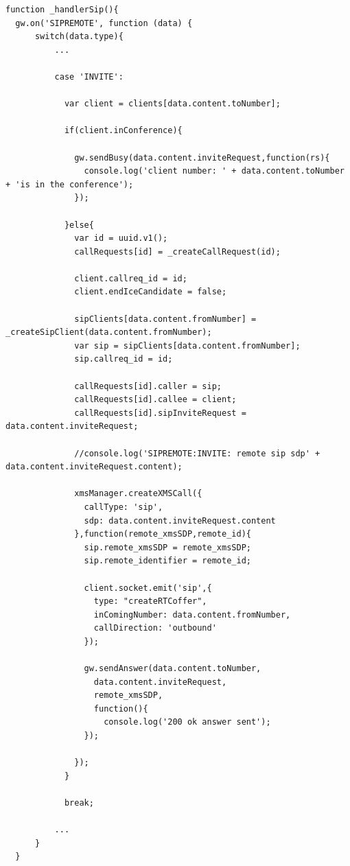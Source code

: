 \begin{lstlisting}[caption={SIPREMOTE event handler for INVITE message},label={code:socket_remote_invite}]
function _handlerSip(){
  gw.on('SIPREMOTE', function (data) {
      switch(data.type){
          ...
          
          case 'INVITE':

            var client = clients[data.content.toNumber];

            if(client.inConference){

              gw.sendBusy(data.content.inviteRequest,function(rs){
                console.log('client number: ' + data.content.toNumber + 'is in the conference');
              });

            }else{
              var id = uuid.v1();
              callRequests[id] = _createCallRequest(id);

              client.callreq_id = id;
              client.endIceCandidate = false;

              sipClients[data.content.fromNumber] = _createSipClient(data.content.fromNumber);
              var sip = sipClients[data.content.fromNumber];
              sip.callreq_id = id;

              callRequests[id].caller = sip;
              callRequests[id].callee = client;
              callRequests[id].sipInviteRequest = data.content.inviteRequest;

              //console.log('SIPREMOTE:INVITE: remote sip sdp' + data.content.inviteRequest.content);

              xmsManager.createXMSCall({
                callType: 'sip',
                sdp: data.content.inviteRequest.content
              },function(remote_xmsSDP,remote_id){
                sip.remote_xmsSDP = remote_xmsSDP;
                sip.remote_identifier = remote_id;

                client.socket.emit('sip',{
                  type: "createRTCoffer",
                  inComingNumber: data.content.fromNumber,
                  callDirection: 'outbound'
                });

                gw.sendAnswer(data.content.toNumber,
                  data.content.inviteRequest,
                  remote_xmsSDP,
                  function(){
                    console.log('200 ok answer sent');
                });

              });
            }
        
            break;
          
          ...
      }
  }
\end{lstlisting}

